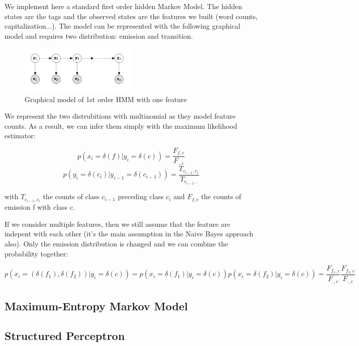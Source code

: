 \documentclass[11pt]{article}
\begin{document}
We implement here a standard first order hidden Markov Model. The hidden states are the tags and the observed states are the features we built (word counts, capitalization...). The model can be represented with the following graphical model and requires two distribution: emission and transition.

\begin{figure}[H]
\begin{center}
    \includegraphics[width=0.5\textwidth]{hmm}
    \caption{Graphical model of 1st order HMM with one feature}
\end{center}
\end{figure}

We represent the two distrubitions with multinomial as they model feature counts. As a result, we can infer them simply with the maximum likelihood estimator:

\[
p(x_i=\delta(f)|y_i=\delta(c)) = \frac{F_{f,c}}{F_{.,c}}
\]
\[
p(y_i=\delta(c_i)|y_{i-1}=\delta(c_{i-1})) = \frac{T_{c_{i-1},c_i}}{T_{c_{i-1},.}}
\]

with $T_{c_{i-1},c_i}$ the counts of class $c_{i-1}$ preceding class $c_i$ and $F_{f,c}$ the counts of emission f with class c.

If we consider multiple features, then we still assume that the feature are indepent with each other (it's the main assumption in the Naive Bayes approach also). Only the emission distribution is changed and we can combine the probability together:

\[
p(x_i=(\delta(f_1), \delta(f_2))|y_i=\delta(c)) = p(x_i=\delta(f_1)|y_i=\delta(c)) p(x_i=\delta(f_2)|y_i=\delta(c)) =
\frac{F_{f_1,c}}{F_{.,c}}  \frac{F_{f_2,c}}{F_{.,c}}
\]




\subsection{Maximum-Entropy Markov Model}


\subsection{Structured Perceptron}
\end{document}
